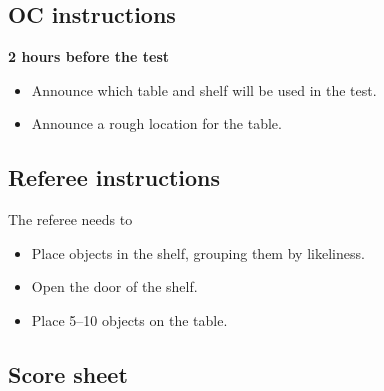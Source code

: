 \newpage
\subsection*{OC instructions}

\textbf{2 hours before the test}
\begin{itemize}
	\item Announce which table and shelf will be used in the test.
	\item Announce a rough location for the table.
\end{itemize}

\subsection*{Referee instructions}
The referee needs to
\begin{itemize}
	\item Place objects in the shelf, grouping them by likeliness.
	\item Open the door of the shelf.
	\item Place 5--10 objects on the table.
\end{itemize}


\subsection*{Score sheet}



